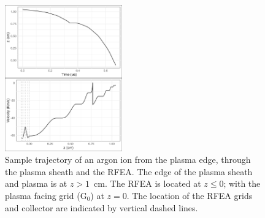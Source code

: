 \documentclass[%
 aapm,
 mph,%
 amsmath,amssymb,
 reprint,%
]{revtex4-2}
\begin{document}
\begin{figure}[htbp]
    \centering
    \includegraphics[width=0.45\textwidth]{Figures/ionTrajectory2Pa13.56MHz2kVStack2332.jpeg}
    \caption{Sample trajectory of an argon ion from the plasma edge, through the plasma sheath and the RFEA. The edge of the plasma sheath and plasma is at $z>1$~cm. The RFEA is located at $z\le0$; with the plasma facing grid (G$_0$) at $z=0$. The location of the RFEA grids and collector are indicated by vertical dashed lines.}
    \label{fig:your_label}
\end{figure}



\cite{Lieberman1988, Wild1991, Bohm1993, Ries2021}

\nocite{*}
\end{document}
